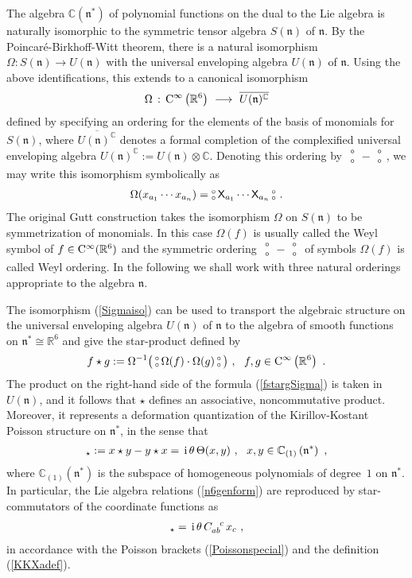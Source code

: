 \documentclass[11pt,a4paper]{article}
\newcommand{\NO}{\mbox{$\substack{\circ\\\circ}$}}      %
\newcommand{\1}{\mathbb{1}}
\def\ii{{\,{\rm i}\,}}
\def\CC{{\rm C}}
\def\X{{\sf X}}
\def\mfn{{\mathfrak n}}
\newcommand{\complex}{{\mathbb C}} %
\newcommand{\real}{{\mathbb R}} %
\newcommand{\beq}{\begin{eqnarray}}
\newcommand{\eeq}{\end{eqnarray}}
\begin{document}
The algebra $\complex(\mfn^*)$ of polynomial functions on the dual
to the Lie algebra is naturally isomorphic to the symmetric tensor algebra
$S(\mfn)$ of $\mfn$. By the Poincar\'e-Birkhoff-Witt theorem,
there is a natural isomorphism $\Omega:S(\mfn)\to
U(\mfn)$ with the universal enveloping algebra $U(\mfn)$ of
$\mfn$. Using the above identifications, this extends to a canonical
isomorphism
\beq
\Omega\,:\,\CC^\infty\left(\real^6\right)~\longrightarrow~\overline{
U(\mfn)^\complex}
\label{Sigmaiso}\eeq
defined by specifying an ordering for the elements of the
basis of monomials for $S(\mfn)$, where
$\overline{U(\mfn)^\complex}$ denotes a formal completion of the
complexified universal enveloping algebra
$U(\mathfrak{n})^\complex:=U(\mathfrak{n})\otimes\complex$.
Denoting this ordering by $\NO-\NO$, we may write this
isomorphism symbolically as
\beq
\Omega(x_{a_1}\cdots x_{a_n})=\NO\,\X_{a_1}\cdots\X_{a_n}\,\NO \ .
\label{Sigmasymbol}\eeq
The original Gutt construction takes the isomorphism
$\Omega$ on $S(\mfn)$ to be symmetrization of monomials. In this
case $\Omega(f)$ is usually called the Weyl symbol of
$f\in\CC^\infty(\real^6)$ and the symmetric ordering $\NO-\NO$
of symbols $\Omega(f)$ is called Weyl ordering. In the following we
shall work with three natural orderings appropriate to the
algebra $\mfn$.

The isomorphism (\ref{Sigmaiso}) can be used to transport the
algebraic structure on the universal enveloping algebra $U(\mfn)$ of
$\mfn$ to the algebra of smooth functions on $\mfn^*\cong\real^6$
and give the star-product defined by
\beq
f\star g:=\Omega^{-1}\bigl(\,\NO\,\Omega(f)\cdot\Omega(g)\,\NO
\,\bigr) \ , ~~ f,g\in\CC^\infty\left(\real^6\right) \ .
\label{fstargSigma}\eeq
The product on the right-hand side of the formula (\ref{fstargSigma})
is taken in $U(\mfn)$, and it follows that $\star$ defines an
associative, noncommutative product. Moreover, it represents a
deformation quantization of the Kirillov-Kostant Poisson structure on
$\mfn^*$, in the sense that
\beq
[x,y]_\star:=x\star y-y\star x=\ii
\theta\,\Theta(x,y) \ , ~~ x,y\in\complex_{(1)}\left(\mfn^*\right) \ ,
\label{xyPoisson}\eeq
where $\complex_{(1)}(\mfn^*)$ is the subspace of homogeneous
polynomials of degree~$1$ on $\mfn^*$. In particular, the Lie
algebra relations (\ref{n6genform}) are reproduced by star-commutators
of the coordinate functions as
\beq
[x_a,x_b]_\star=\ii\theta\,C_{ab}^{~~c}\,x_c \ ,
\label{xaxbstarcomm}\eeq
in accordance with the Poisson brackets (\ref{Poissonspecial}) and the
definition (\ref{KKXadef}).
\end{document}
